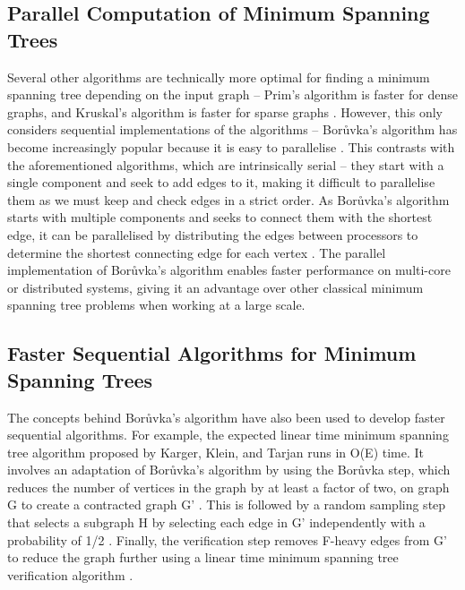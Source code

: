 \documentclass[a4paper, 11pt]{article}
\begin{document}
\newpage
\subsection{Parallel Computation of Minimum Spanning Trees}
Several other algorithms are technically more optimal for finding a minimum spanning tree depending on the input graph -- Prim's algorithm is faster for dense graphs, and Kruskal's algorithm is faster for sparse graphs \cite{bazlamaccci2001minimum}. However, this only considers sequential implementations of the algorithms -- Borůvka's algorithm has become increasingly popular because it is easy to parallelise \cite{mariano2015generic}. This contrasts with the aforementioned algorithms, which are intrinsically serial -- they start with a single component and seek to add edges to it, making it difficult to parallelise them as we must keep and check edges in a strict order. As Borůvka's algorithm starts with multiple components and seeks to connect them with the shortest edge, it can be parallelised by distributing the edges between processors to determine the shortest connecting edge for each vertex \cite{chung1996parallel}. The parallel implementation of Borůvka's algorithm enables faster performance on multi-core or distributed systems, giving it an advantage over other classical minimum spanning tree problems when working at a large scale.

\subsection{Faster Sequential Algorithms for Minimum Spanning Trees}
The concepts behind Borůvka's algorithm have also been used to develop faster sequential algorithms. For example, the expected linear time minimum spanning tree algorithm proposed by Karger, Klein, and Tarjan runs in O(E) time. It involves an adaptation of Borůvka's algorithm by using the Borůvka step, which reduces the number of vertices in the graph by at least a factor of two, on graph G to create a contracted graph G' \cite{dixon1992verification, king1995simpler}. This is followed by a random sampling step that selects a subgraph H by selecting each edge in G' independently with a probability of 1/2 \cite{bazlamaccci2001minimum}. Finally, the verification step removes F-heavy edges from G' to reduce the graph further using a linear time minimum spanning tree verification algorithm \cite{dixon1992verification, king1995simpler, karger1995randomized}.

\newpage


\end{document}
